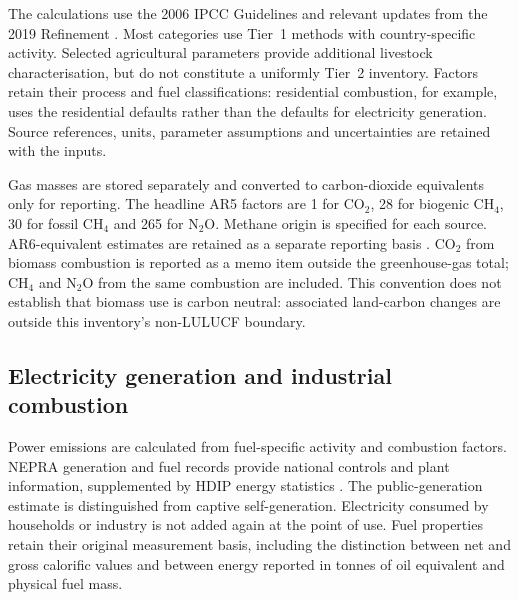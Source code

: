 \documentclass[essd]{copernicus}
\begin{document}
The calculations use the 2006 IPCC Guidelines and relevant updates from the 2019 Refinement \citep{IPCC2006,IPCC2019}. Most categories use Tier~1 methods with country-specific activity. Selected agricultural parameters provide additional livestock characterisation, but do not constitute a uniformly Tier~2 inventory. Factors retain their process and fuel classifications: residential combustion, for example, uses the residential defaults rather than the defaults for electricity generation. Source references, units, parameter assumptions and uncertainties are retained with the inputs.

Gas masses are stored separately and converted to carbon-dioxide equivalents only for reporting. The headline AR5 factors \citep{IPCCAR5} are 1 for CO$_2$, 28 for biogenic CH$_4$, 30 for fossil CH$_4$ and 265 for N$_2$O. Methane origin is specified for each source. AR6-equivalent estimates are retained as a separate reporting basis \citep{IPCCAR6}. CO$_2$ from biomass combustion is reported as a memo item outside the greenhouse-gas total; CH$_4$ and N$_2$O from the same combustion are included. This convention does not establish that biomass use is carbon neutral: associated land-carbon changes are outside this inventory's non-LULUCF boundary.



\subsection{Electricity generation and industrial combustion}
\label{sec:energy_methods}

Power emissions are calculated from fuel-specific activity and combustion factors. NEPRA generation and fuel records provide national controls and plant information, supplemented by HDIP energy statistics \citep{NEPRA2024}. The public-generation estimate is distinguished from captive self-generation. Electricity consumed by households or industry is not added again at the point of use. Fuel properties retain their original measurement basis, including the distinction between net and gross calorific values and between energy reported in tonnes of oil equivalent and physical fuel mass.
\end{document}
